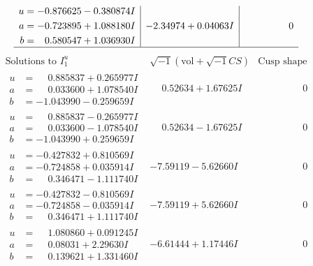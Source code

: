 \documentclass[1p]{elsarticle_modified}
\theoremstyle{definition}
\newcommand{\I}{\sqrt{-1}}
\begin{document}
$$\begin{array}{c|c|c}
\begin{aligned}
u &= -0.876625 - 0.380874 I \\
a &= -0.723895 + 1.088180 I \\
b &= \phantom{-}0.580547 + 1.036930 I\end{aligned}
 & -2.34974 + 0.04063 I & \phantom{-0.000000 } 0\\
 \hline 
 \end{array}$$\newpage$$\begin{array}{c|c|c}  
\text{Solutions to }I^u_{1}& \I (\text{vol} + \sqrt{-1}CS) & \text{Cusp shape}\\
 \hline 
\begin{aligned}
u &= \phantom{-}0.885837 + 0.265977 I \\
a &= \phantom{-}0.033600 + 1.078540 I \\
b &= -1.043990 - 0.259659 I\end{aligned}
 & \phantom{-}0.52634 + 1.67625 I & \phantom{-0.000000 } 0 \\ \hline\begin{aligned}
u &= \phantom{-}0.885837 - 0.265977 I \\
a &= \phantom{-}0.033600 - 1.078540 I \\
b &= -1.043990 + 0.259659 I\end{aligned}
 & \phantom{-}0.52634 - 1.67625 I & \phantom{-0.000000 } 0 \\ \hline\begin{aligned}
u &= -0.427832 + 0.810569 I \\
a &= -0.724858 + 0.035914 I \\
b &= \phantom{-}0.346471 - 1.111740 I\end{aligned}
 & -7.59119 - 5.62660 I & \phantom{-0.000000 } 0 \\ \hline\begin{aligned}
u &= -0.427832 - 0.810569 I \\
a &= -0.724858 - 0.035914 I \\
b &= \phantom{-}0.346471 + 1.111740 I\end{aligned}
 & -7.59119 + 5.62660 I & \phantom{-0.000000 } 0 \\ \hline\begin{aligned}
u &= \phantom{-}1.080860 + 0.091245 I \\
a &= \phantom{-}0.08031 + 2.29630 I \\
b &= \phantom{-}0.139621 + 1.331460 I\end{aligned}
 & -6.61444 + 1.17446 I & \phantom{-0.000000 } 0 \\ \hline\begin{aligned}

\end{aligned}
\end{array}$$
\end{document}

